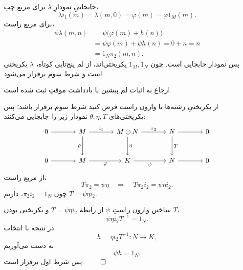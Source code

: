 \begin{frame}[t]{جابجاییِ نمودارِ \(\lambda\)}
    \label{lec16:split-right-squares}
    برای مربع چپ،
    \[
        \lambda i_1(m)=\lambda(m,0)=\varphi(m)=\varphi1_M(m).
    \]
    برای مربع راست،
    \begin{align*}
        \psi\lambda(m,n)
            &=\psi\bigl(\varphi(m)+h(n)\bigr)\\
            &=\psi\varphi(m)+\psi h(n)=0+n=n\\
            &=1_N\pi_2(m,n).
    \end{align*}
    پس نمودار جابجایی است. چون \(1_M,1_N\) یکریختی‌اند، از لم پنج‌تایی کوتاه،
    \(\lambda\) یکریختی است و شرط سوم برقرار می‌شود.
    \medskip

    {\footnotesize ارجاع به اثبات لم پیشین با یادداشت موقتِ  ثبت شده است.}
\end{frame}

\begin{frame}[t]{از یکریختیِ رشته‌ها تا وارون راست}
    \label{lec16:split-equivalence-right}
    فرض کنید شرط سوم برقرار باشد؛ پس یکریختی‌های \(\theta,\eta,T\) نمودار زیر را جابجایی می‌کنند:
    \[
    \begin{tikzcd}[ampersand replacement=\&,column sep=large,row sep=large]
        0\arrow[r]\& M\arrow[r,"i_1"]\arrow[d,"\theta"']
        \&M\oplus N\arrow[r,"\pi_2"]\arrow[d,"\eta"]
        \&N\arrow[r]\arrow[d,"T"]\&0\\
        0\arrow[r]\& M\arrow[r,"\varphi"']
        \&K\arrow[r,"\psi"']\&N\arrow[r]\&0
    \end{tikzcd}
    \]
    از مربع راست،
    \[
        T\pi_2=\psi\eta
        \quad\Longrightarrow\quad
        T\pi_2i_2=\psi\eta i_2.
    \]
    چون \(\pi_2i_2=1_N\)، داریم \(T=\psi\eta i_2\).
\end{frame}

\begin{frame}[t]{ساختن وارون راستِ \(\psi\)}
    \label{lec16:split-right-inverse}
    از رابطهٔ \(T=\psi\eta i_2\) و یکریختی بودن \(T\)،
    \[
        \psi\eta i_2T^{-1}=1_N.
    \]
    در نتیجه با انتخاب
    \[
        h=\eta i_2T^{-1}:N\longrightarrow K,
    \]
    به دست می‌آوریم
    \[
        \psi h=1_N.
    \]
    پس شرط اول برقرار است. \hfill\(\qed\)
\end{frame}

